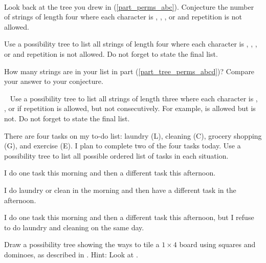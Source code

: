 \begin{exer} [\exerP]%
\label{exer_4strings_norepeat}
~
    \begin{exerpart} 
        \item Look back at the tree you drew in  (\ref{part_perms_abc}). Conjecture the number of strings of length four where each character is , , , or  and repetition is not allowed.
        \item \label{part_tree_perms_abcd}  Use a possibility tree to list all strings of length four where each character is , , , or  and repetition is not allowed. Do not forget to state the final list.
        \item How many strings are in your list in part (\ref{part_tree_perms_abcd})?  Compare your answer to your conjecture.
    \end{exerpart}
\end{exer}

\begin{exer} [\exerU]%
\label{exer_tree_3-strings}
    ~
    Use a possibility tree to list all strings of length three where each character is , , or  if repetition is allowed, but not consecutively.  For example,  is allowed but  is not. Do not forget to state the final list. 
\end{exer}

\begin{exer} [\exerU]%
\label{exer_tree_mytodolist}
    There are four tasks on my to-do list: laundry (L), cleaning (C), grocery shopping (G), and exercise (E). I plan to complete two of the four tasks today.  Use a possibility tree to list all possible ordered list of tasks in each situation. 
    \begin{exerpart}
        \item I do one task this morning and then a different task this afternoon.
        \item I do laundry or clean in the morning and then have a different task in the afternoon.
        \item I do one task this morning and then a different task this afternoon, but I refuse to do laundry and cleaning on the same day. 
    \end{exerpart}
\end{exer}

\begin{exer}[\exerU] %
\label{exer_sq_dom4_tree}
    Draw a possibility tree showing the ways to tile a $1 \times 4$ board using squares and dominoes, as described in .  Hint: Look at .
\end{exer}

